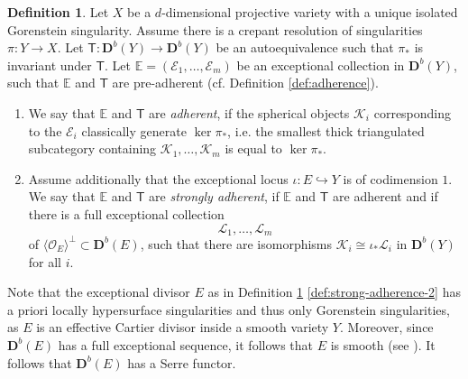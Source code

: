 \documentclass[a4paper,11pt, reqno]{amsart}
\def\E{\mathbb E}
\def\DD{\mathbf D}
\def\OO{\mathcal O}
\def\sE{\mathscr{E}}
\def\sK{\mathscr{K}}
\def\sL{\mathscr{L}}
\def\Db{\DD^b}
\newcommand{\bT}{\mathsf{T}}
\theoremstyle{plain}
\theoremstyle{definition}
\newtheorem{definition}[dummy]{Definition}
\numberwithin{equation}{section}
\newlength{\arrow}
\begin{document}
\begin{definition}\label{def:strong-adherence}
    Let $X$ be a $d$-dimensional projective variety with a unique isolated Gorenstein singularity. Assume
    there is a crepant resolution of singularities
     $\pi \colon Y \to X$.
    Let $\bT : \Db(Y) \to \Db(Y) $ be an autoequivalence such that $\pi_\ast$ is invariant under $\bT$.
    Let $\E = ( \sE_1 , \ldots , \sE_m )$ be an exceptional collection in $\Db(Y)$, such that $\E$ and $\bT$ are  pre-adherent (cf. Definition \ref{def:adherence}).
    \begin{enumerate}
        \item\label{def:strong-adherence-1} 
        We say that $\E$ and $\bT$ are \emph{adherent}, if the spherical objects $\sK_i$ corresponding to the $\sE_i$ classically generate $\ker \pi_\ast$,
        i.e. the smallest thick triangulated subcategory containing $\sK_1 , \ldots , \sK_m$ is equal to $\ker\pi_\ast$.
        \item\label{def:strong-adherence-2} 
        Assume additionally that the exceptional locus $\iota \colon E \hookrightarrow Y$ is of codimension $1$.
        We say that $\E$ and $\bT$ are \emph{strongly adherent}, if $\E$ and $\bT$ are adherent  and if there is a full exceptional collection 
        \[
    \sL_1 , \ldots , \sL_m
\]
    of $\langle \OO_E \rangle^{\perp} \subset \Db(E)$, such that there are isomorphisms $\sK_i \cong \iota_\ast \sL_i$ in $\Db(Y)$ for all $i$.
    \end{enumerate}
\end{definition}

Note that the exceptional divisor 
$E$ as in Definition \ref{def:strong-adherence} \eqref{def:strong-adherence-2} has 
a priori locally hypersurface singularities and thus only Gorenstein singularities, as $E$ is an effective Cartier divisor inside a smooth variety $Y$.
Moreover, since $\Db(E)$ has a full exceptional sequence, it follows that $E$ is smooth (see  \cite[Corollary 4.15]{ks2}).
It follows that $\Db(E)$ has a Serre functor.
\end{document}
